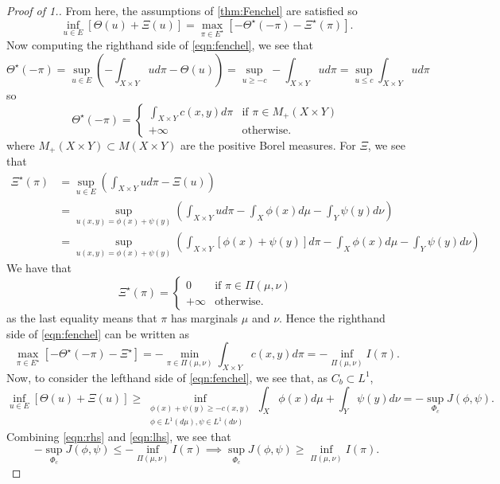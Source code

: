 \documentclass[12pt]{article}
\theoremstyle{plain}
\numberwithin{equation}{section}
\begin{document}
\begin{proof}[Proof of 1.]
From here, the assumptions of \autoref{thm:Fenchel} are satisfied so 
\begin{equation}\label{eqn:fenchel}
  \inf_{u\in E}[\Theta(u) + \Xi(u)] = \max_{\pi \in E^\star}[-\Theta^\star(-\pi) - \Xi^\star(\pi)].
\end{equation}
Now computing the righthand side of \autoref{eqn:fenchel}, we see that 
\[\Theta^\star(-\pi) = \sup_{u\in E}\left(-\int_{X\times Y}ud\pi - \Theta(u)\right) = \sup_{u \ge -c} -\int_{X\times Y}ud\pi = \sup_{u\le c}\int_{X\times Y}ud\pi\]
so \[\Theta^\star(-\pi) = \begin{cases}
  \int_{X\times Y} c(x,y)d\pi &\text{if } \pi\in M_+(X\times Y) \\
  +\infty &\text{otherwise.}
\end{cases}\]
where $M_+(X\times Y) \subset M(X\times Y)$ are the positive Borel measures. For $\Xi$, we see that 
\begin{align*}
  \Xi^\star(\pi) &= \sup_{u\in E}\left(\int_{X\times Y}ud\pi - \Xi(u)\right)\\
  & = \sup_{u(x,y) = \phi(x) + \psi(y)}\left(\int_{X\times Y}ud\pi - \int_X\phi(x)d\mu - \int_Y\psi(y)d\nu\right) \\
  &= \sup_{u(x,y) = \phi(x) + \psi(y)}\left(\int_{X\times Y}[\phi(x) + \psi(y)]d\pi - \int_X\phi(x)d\mu - \int_Y\psi(y)d\nu\right)
\end{align*}
We have that 
\[\Xi^\star(\pi) = \begin{cases}
  0 &\text{if }\pi\in\Pi(\mu,\nu) \\
  +\infty &\text{otherwise.}
\end{cases}\]
as the last equality means that $\pi$ has marginals $\mu$ and $\nu$.
Hence the righthand side of \autoref{eqn:fenchel} can be written as 
\begin{equation}\label{eqn:rhs}
  \max_{\pi\in E^\star}[-\Theta^\star(-\pi) - \Xi^\star] = -\min_{\pi\in \Pi(\mu,\nu)} \int_{X\times Y} c(x,y)d\pi = - \inf_{\Pi(\mu,\nu)}I(\pi).
\end{equation}
Now, to consider the lefthand side of \autoref{eqn:fenchel}, we see that, as $C_b\subset L^1$,
\begin{equation}\label{eqn:lhs}
  \inf_{u\in E} [\Theta(u) + \Xi(u)] \ge \inf_{\substack{\phi(x) + \psi(y) \ge -c(x,y)\\ \phi\in L^1(d\mu),\psi\in L^1(d\nu)}} \int_X\phi(x)d\mu + \int_Y\psi(y)d\nu = -\sup_{\Phi_c} J(\phi,\psi).
\end{equation}
Combining \autoref{eqn:rhs} and \autoref{eqn:lhs}, we see that 
\begin{equation}
  - \sup_{\Phi_c}J(\phi,\psi)\le - \inf_{\Pi(\mu,\nu)}I(\pi) \implies \sup_{\Phi_c}J(\phi,\psi)\ge \inf_{\Pi(\mu,\nu)}I(\pi).
\end{equation}
\end{proof}
\end{document}
